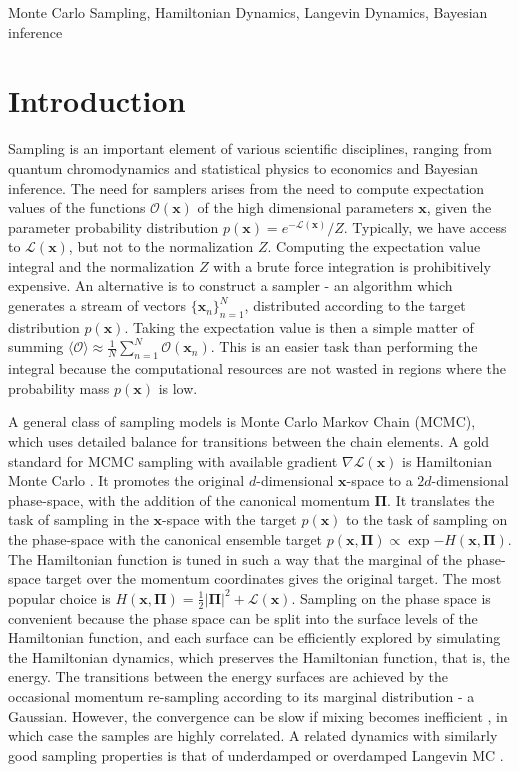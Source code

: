 \documentclass[twoside,11pt]{article}
\newcommand{\p}{\boldsymbol{\Pi}}
\newcommand{\x}{\boldsymbol{x}}
\begin{document}
\begin{keywords}
  Monte Carlo Sampling, Hamiltonian Dynamics, Langevin Dynamics, Bayesian inference
\end{keywords}


\section{Introduction}

Sampling is an important element of various scientific disciplines, ranging from quantum chromodynamics and statistical physics to economics and Bayesian inference. The need for samplers arises from the need to compute expectation values of the functions $\mathcal{O}(\x)$ of the high dimensional parameters $\x$, given the parameter probability distribution $p(\x) = e^{- \mathcal{L}(\x)} / Z$. Typically, we have access to $\mathcal{L}(\x)$, but 
not to the normalization $Z$. 
Computing the expectation value integral and the normalization $Z$ with a brute force 
integration is prohibitively expensive. An alternative is to construct a sampler - an algorithm which generates a stream of vectors $\{ \x_n \}_{n = 1}^{N}$, distributed according to the target distribution $p(\x)$. Taking the expectation value is then a simple matter of summing $\langle \mathcal{O} \rangle \approx \frac{1}{N} \sum_{n = 1}^{N} \mathcal{O}(\x_n)$. This is an easier task than performing the integral because the computational resources are not wasted in regions where the probability mass $p(\x)$ is low.
\par
A general class of sampling models
is Monte Carlo Markov Chain (MCMC), 
which uses detailed balance for 
transitions between the chain 
elements. 
A gold standard for MCMC sampling with 
available gradient $\nabla \mathcal{L}(\x)$ is Hamiltonian Monte Carlo \citep{HMCDuane, HMCneal,conceptualHMC}. It promotes the original $d$-dimensional $\x$-space to a $2 d$-dimensional phase-space, with the addition of the canonical momentum $ \p$. It translates the task of sampling in the $\x$-space with the target $p(\x)$ to the task of sampling on the phase-space with the canonical ensemble target $p(\x, \p) \propto \exp{- H(\x, \p)}$. The Hamiltonian function is tuned in such a way that the marginal of the phase-space target over the momentum coordinates gives the original target. The most popular choice is $H(\x , \p) = \frac{1}{2} \vert \p \vert^2 +\mathcal{L}(\x)$. Sampling on the phase space is convenient because the phase space can be split into the surface levels of the Hamiltonian function, and each surface can be efficiently explored by simulating the Hamiltonian dynamics, which preserves the Hamiltonian function, that is, the energy. The transitions between the energy surfaces are achieved by the occasional momentum re-sampling according to its marginal distribution - a Gaussian. However, the convergence can be slow if mixing becomes inefficient \citep{conceptualHMC}, in which case the 
samples are highly correlated. A related
dynamics with similarly good sampling properties is that of underdamped or 
overdamped Langevin MC \citep{MolecularDynamics}.
\end{document}
